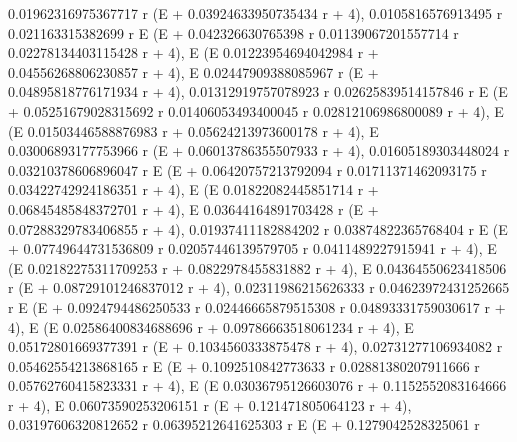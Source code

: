 \documentclass{article}
\begin{document}
       0.01962316975367717 r
     (E                      + 0.03924633950735434 r + 4), 
     0.0105816576913495 r   0.021163315382699 r
    E                     (E                    + 0.042326630765398 r
            0.01139067201557714 r   0.02278134403115428 r
     + 4), E                      (E
                                    0.01223954694042984 r
     + 0.04556268806230857 r + 4), E
       0.02447909388085967 r
     (E                      + 0.04895818776171934 r + 4), 
     0.01312919757078923 r   0.02625839514157846 r
    E                      (E                      + 0.05251679028315692 r
            0.01406053493400045 r   0.02812106986800089 r
     + 4), E                      (E
                                    0.01503446588876983 r
     + 0.05624213973600178 r + 4), E
       0.03006893177753966 r
     (E                      + 0.06013786355507933 r + 4), 
     0.01605189303448024 r   0.03210378606896047 r
    E                      (E                      + 0.06420757213792094 r
            0.01711371462093175 r   0.03422742924186351 r
     + 4), E                      (E
                                    0.01822082445851714 r
     + 0.06845485848372701 r + 4), E
       0.03644164891703428 r
     (E                      + 0.07288329783406855 r + 4), 
     0.01937411182884202 r   0.03874822365768404 r
    E                      (E                      + 0.07749644731536809 r
            0.02057446139579705 r   0.0411489227915941 r
     + 4), E                      (E
                                   0.02182275311709253 r
     + 0.0822978455831882 r + 4), E
       0.04364550623418506 r
     (E                      + 0.08729101246837012 r + 4), 
     0.02311986215626333 r   0.04623972431252665 r
    E                      (E                      + 0.0924794486250533 r
            0.02446665879515308 r   0.04893331759030617 r
     + 4), E                      (E
                                    0.02586400834688696 r
     + 0.09786663518061234 r + 4), E
       0.05172801669377391 r
     (E                      + 0.1034560333875478 r + 4), 
     0.02731277106934082 r   0.05462554213868165 r
    E                      (E                      + 0.1092510842773633 r
            0.02881380207911666 r   0.05762760415823331 r
     + 4), E                      (E
                                   0.03036795126603076 r
     + 0.1152552083164666 r + 4), E
       0.06073590253206151 r
     (E                      + 0.121471805064123 r + 4), 
     0.03197606320812652 r   0.06395212641625303 r
    E                      (E                      + 0.1279042528325061 r
\end{document}
